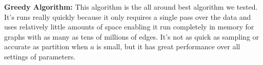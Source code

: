 \textbf{Greedy Algorithm:} This algorithm is the all around best algorithm we tested.
It's runs really quickly because it only requires a single pass over the data and uses
relatively little amounts of space enabling it run completely in memory for graphs with
as many as tens of millions of edges. It's not as quick as sampling or accurate as partition
when $a$ is small, but it has great performance over all settings of parameters.